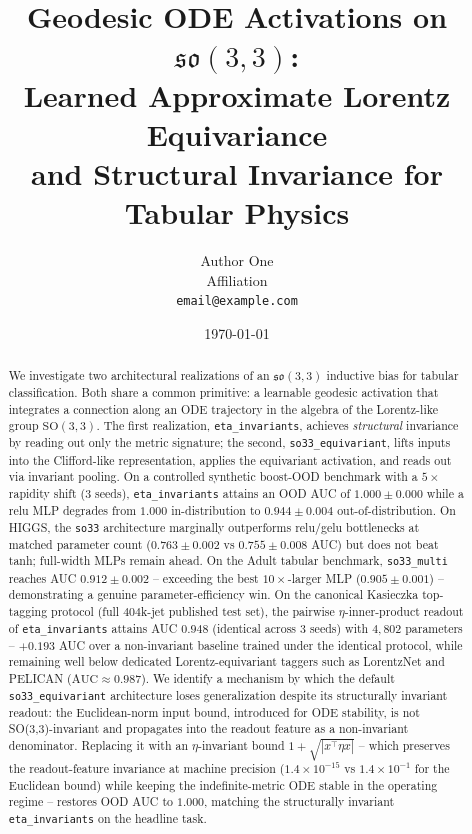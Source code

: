 \documentclass[11pt]{article}
\title{Geodesic ODE Activations on $\mathfrak{so}(3,3)$:\\
       Learned Approximate Lorentz Equivariance\\
       and Structural Invariance for Tabular Physics}
\author{Author One \\ Affiliation \\ \texttt{email@example.com}}
\date{\today}
\begin{document}
\maketitle

\begin{abstract}
We investigate two architectural realizations of an $\mathfrak{so}(3,3)$
inductive bias for tabular classification. Both share a common primitive: a
learnable geodesic activation that integrates a connection along an ODE
trajectory in the algebra of the Lorentz-like group $\mathrm{SO}(3,3)$. The
first realization, \texttt{eta\_invariants}, achieves \emph{structural}
invariance by reading out only the metric signature; the second,
\texttt{so33\_equivariant}, lifts inputs into the Clifford-like
representation, applies the equivariant activation, and reads out via
invariant pooling. On a controlled synthetic boost-OOD benchmark with a
$5\times$ rapidity shift (3 seeds), \texttt{eta\_invariants} attains an
OOD AUC of $1.000 \pm 0.000$ while a relu MLP degrades from $1.000$
in-distribution to $0.944 \pm 0.004$ out-of-distribution. On HIGGS, the
\texttt{so33} architecture marginally outperforms relu/gelu bottlenecks at
matched parameter count ($0.763 \pm 0.002$ vs $0.755 \pm 0.008$ AUC) but
does not beat tanh; full-width MLPs remain ahead. On the Adult tabular
benchmark, \texttt{so33\_multi} reaches AUC $0.912 \pm 0.002$ -- exceeding
the best $10\times$-larger MLP ($0.905 \pm 0.001$) -- demonstrating a
genuine parameter-efficiency win. On the canonical Kasieczka top-tagging
protocol (full $404$k-jet published test set), the pairwise
$\eta$-inner-product readout of \texttt{eta\_invariants} attains AUC
$0.948$ (identical across 3 seeds) with $4{,}802$ parameters --
$+0.193$ AUC over a non-invariant baseline trained under the identical
protocol, while remaining well below dedicated Lorentz-equivariant
taggers such as LorentzNet and PELICAN ($\mathrm{AUC}\approx 0.987$). We identify a mechanism by which the default
\texttt{so33\_equivariant} architecture loses generalization despite
its structurally invariant readout: the Euclidean-norm input bound,
introduced for ODE stability, is not SO(3,3)-invariant and propagates
into the readout feature as a non-invariant denominator. Replacing it
with an $\eta$-invariant bound $1+\sqrt{|x^\top\eta x|}$ -- which preserves
the readout-feature invariance at machine precision
($1.4\times 10^{-15}$ vs $1.4\times 10^{-1}$ for the Euclidean bound)
while keeping the indefinite-metric ODE stable in the operating
regime -- restores OOD AUC to $1.000$, matching the structurally invariant \texttt{eta\_invariants}
on the headline task.
\end{abstract}
\end{document}
